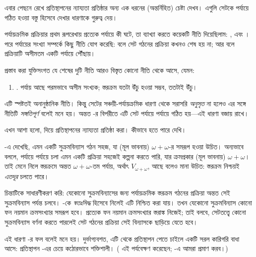 \documentclass[../../../include/open-logic-section]{subfiles}
\begin{document}

এবার \limofsize{} পেছনে রেখে প্রতিস্থাপনের
ন্যায্যতা প্রতিষ্ঠার অন্য এক ধরনের
(অন্তর্নিহিত) চেষ্টা দেখব। এগুলি সেটকে
পর্যায়ে গঠিত হওয়া বস্তু হিসেবে দেখার
ধারণাকে গুরুত্ব দেয়।

পর্যায়ক্রমিক প্রক্রিয়ার প্রথম রূপরেখায়
প্রত্যেক পর্যায়ে কী ঘটে, তা ব্যাখ্যা করতে
কয়েকটি নীতি দিয়েছিলাম: \stageshier,
\stagesord{} এবং \stagesacc। পরে পর্যায়ের
সংখ্যা সম্পর্কে কিছু নীতি যোগ করেছি:
\stagessucc{} বলে সেট গঠনের প্রক্রিয়া
কখনও শেষ হয় না; আর \stagesinf{} বলে
প্রক্রিয়াটি অসীমতম একটি পর্যায়ে পৌঁছায়।

প্রস্তাব করা যুক্তিসংগত যে শেষের দুটি নীতি
আরও বিস্তৃত কোনো নীতি থেকে আসে, যেমন:
\begin{enumerate}
	\item[] \stagesinex. পর্যায় আছে পরমভাবে
	অসীম সংখ্যক; স্তরক্রম যতটা উঁচু হওয়া
	সম্ভব, ততটাই উঁচু।
\end{enumerate}
এটি স্পষ্টতই অনানুষ্ঠানিক নীতি। কিন্তু
সেটের সঞ্চয়ী-পর্যায়ক্রমিক ধারণা থেকে
সরাসরি \emph{অনুসৃত} না হলেও এর সঙ্গে
নীতিটি \emph{সঙ্গতিপূর্ণ} বলেই মনে হয়।
অন্তত \limofsize-র বিপরীতে এটি সেট
পর্যায়ে পর্যায়ে গঠিত হয়—এই ধারণা
বজায় রাখে।

এখন আশা হলো, \stagesinex{} দিয়ে
প্রতিস্থাপনের ন্যায্যতা প্রতিষ্ঠা করা।
কীভাবে হতে পারে দেখি।

-এ দেখেছি,
এমন একটি সুক্রমবিন্যাস গঠন সহজ,
যা (মূল ভাবনায়) $\omega+\omega$-র
সমরূপ হওয়া উচিত। অন্যভাবে বললে,
পর্যায়ে পর্যায়ে চলা এমন একটি প্রক্রিয়া
সহজেই কল্পনা করতে পারি, যার ক্রমপ্রকার
(মূল ভাবনায়) $\omega+\omega$। তাই
\stagesinex{} মেনে নিলে স্তরক্রমে অন্তত
$\omega+\omega$-তম পর্যায়, অর্থাৎ
$V_{\omega+\omega}$, আছে বলেও মানা উচিত:
স্তরক্রম নিশ্চয়ই \emph{এতদূর} চলতে পারে।

চিন্তাটিকে সাধারণীকরণ করি: যেকোনো
সুক্রমবিন্যাসের জন্য পর্যায়ক্রমিক স্তরক্রম
গঠনের প্রক্রিয়া অন্তত সেই সুক্রমবিন্যাস
পর্যন্ত চলবে। -কে
\emph{স্বতঃসিদ্ধ} হিসেবে নিলেই এটি
নিশ্চিত করা যায়। তখন যেকোনো
সুক্রমবিন্যাস কোনো ফন নয়মান ক্রমসংখ্যার
সমরূপ হবে। প্রত্যেক ফন নয়মান ক্রমসংখ্যার
স্তরাঙ্ক নিজেই; তাই
বলবে, সেটতত্ত্বে কোনো সুক্রমবিন্যাস
বর্ণনা করতে পারলেই সেট গঠনের প্রক্রিয়া
সেই বিন্যাসকে ছাড়িয়ে যেতে হবে।

এই ধারণা \stagesinex-র ফল বলেই
মনে হয়। দুর্ভাগ্যবশত, এটি থেকে
প্রতিস্থাপন পেতে চাইলে একটি সরল
কারিগরি বাধা আসে: প্রতিস্থাপন
-এর
চেয়ে কঠোরভাবে শক্তিশালী।
(\citet[\S13.2]{Potter2004} এই পর্যবেক্ষণ
করেছেন; -এ
আমরা প্রমাণ করব।)
\end{document}
